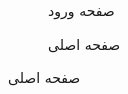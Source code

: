\documentclass[a4paper,12pt]{report}
\begin{document}
	\begin{figure}[!h]
		\centering
		\footnotesize
		\begin{subfigure}[t]{0.47\linewidth}
			\caption{
				صفحه ورود}
		\end{subfigure}\hfill%
		\begin{subfigure}[t]{0.47\linewidth}
			\caption{
				صفحه اصلی}
		\end{subfigure}
	

\end{figure}
\end{document}
